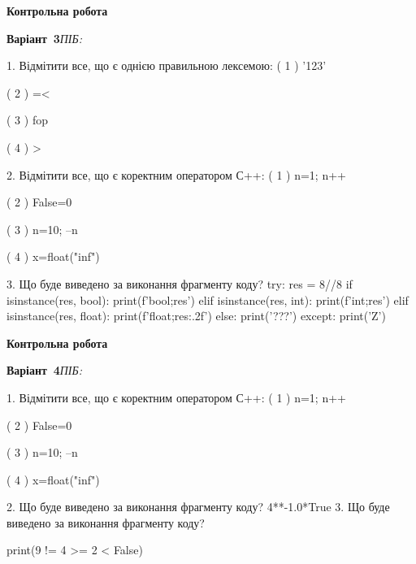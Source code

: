 \documentclass[11pt]{article}
\begin{document}



\newpage

\newpage

{\large\textbf{Контрольна робота}}

\textbf{Варіант \No\,3}\hfill \textit{ПІБ:}\,\underline{\hspace{60mm}}
\vspace{4mm}

1. Відмітити все, що є однією правильною лексемою:
( 1 ) '123'

( 2 ) =<

( 3 ) fop

( 4 ) >

2. Відмітити все, що є коректним оператором С++:
( 1 ) n=1; n++

( 2 ) False=0

( 3 ) n=10; --n

( 4 ) x=float("inf")

3. Що буде виведено за виконання фрагменту коду?
try:
    res = 8//8%
    if isinstance(res, bool):
        print(f'bool;{res}')
    elif isinstance(res, int):
        print(f'int;{res}')
    elif isinstance(res, float):
        print(f'float;{res:.2f}')
    else:
        print('???')
except:
    print('Z')




\newpage

\newpage

{\large\textbf{Контрольна робота}}

\textbf{Варіант \No\,4}\hfill \textit{ПІБ:}\,\underline{\hspace{60mm}}
\vspace{4mm}

1. Відмітити все, що є коректним оператором С++:
( 1 ) n=1; n++

( 2 ) False=0

( 3 ) n=10; --n

( 4 ) x=float("inf")

2. Що буде виведено за виконання фрагменту коду?
4**-1.0*True
3. Що буде виведено за виконання фрагменту коду?

print(9 != 4 >= 2 < False)




\newpage
\end{document}

